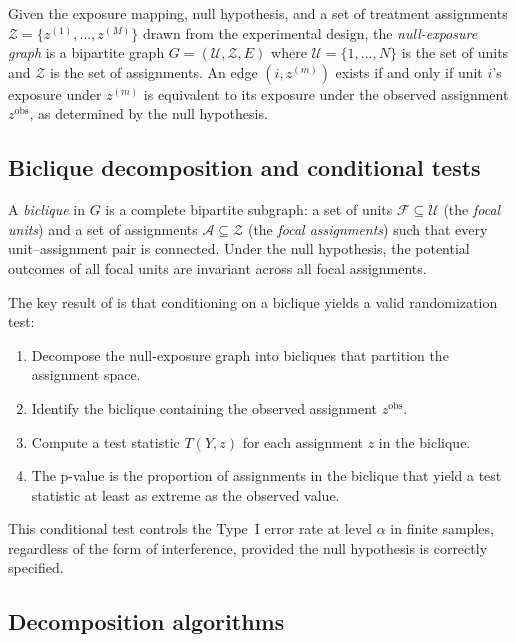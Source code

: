 \documentclass[article]{jss}
\begin{document}
Given the exposure mapping, null hypothesis, and a set of treatment
assignments $\mathcal{Z} = \{z^{(1)}, \ldots, z^{(M)}\}$ drawn from the
experimental design, the \emph{null-exposure graph} is a bipartite graph
$G = (\mathcal{U}, \mathcal{Z}, E)$ where $\mathcal{U} = \{1, \ldots,
N\}$ is the set of units and $\mathcal{Z}$ is the set of assignments.  An
edge $(i, z^{(m)})$ exists if and only if unit $i$'s exposure under
$z^{(m)}$ is equivalent to its exposure under the observed assignment
$z^{\text{obs}}$, as determined by the null hypothesis.

\subsection{Biclique decomposition and conditional tests}

A \emph{biclique} in $G$ is a complete bipartite subgraph: a set of units
$\mathcal{F} \subseteq \mathcal{U}$ (the \emph{focal units}) and a set
of assignments $\mathcal{A} \subseteq \mathcal{Z}$ (the \emph{focal
assignments}) such that every unit--assignment pair is connected.  Under
the null hypothesis, the potential outcomes of all focal units are
invariant across all focal assignments.

The key result of \citet{puelz2022graph} is that conditioning on a
biclique yields a valid randomization test:
\begin{enumerate}
  \item Decompose the null-exposure graph into bicliques that partition
        the assignment space.
  \item Identify the biclique containing the observed assignment
        $z^{\text{obs}}$.
  \item Compute a test statistic $T(Y, z)$ for each assignment $z$ in the
        biclique.
  \item The p-value is the proportion of assignments in the biclique that
        yield a test statistic at least as extreme as the observed value.
\end{enumerate}

This conditional test controls the Type~I error rate at level $\alpha$ in
finite samples, regardless of the form of interference, provided the null
hypothesis is correctly specified.

\subsection{Decomposition algorithms}
\end{document}
